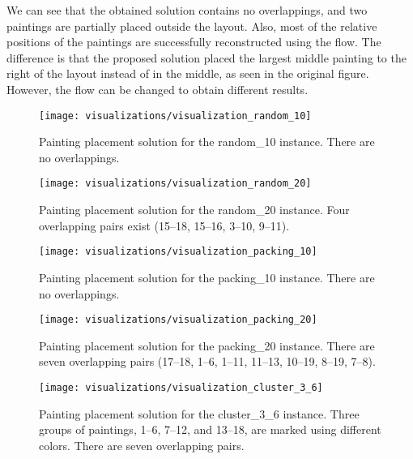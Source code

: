 We can see that the obtained solution contains no overlappings, and two paintings are partially placed outside the layout.
Also, most of the relative positions of the paintings are successfully reconstructed using the flow.
The difference is that the proposed solution placed the largest middle painting to the right of the layout
instead of in the middle, as seen in the original figure.
However, the flow can be changed to obtain different results.


\clearpage
\newpage

\begin{figure}[h!]
    \texttt{[image: visualizations/visualization\_random\_10]}
    \caption[Painting placement solution for the random\_10 instance]
        {Painting placement solution for the random\_10 instance.
    There are no overlappings.}
    \label{fig:results:visualization-random-10}
\end{figure}

\begin{figure}[h!]
    \texttt{[image: visualizations/visualization\_random\_20]}
    \caption[Painting placement solution for the random\_20 instance]
        {Painting placement solution for the random\_20 instance.
    Four overlapping pairs exist (15–18, 15–16, 3–10, 9–11).}
    \label{fig:results:visualization-random-20}
\end{figure}

\begin{figure}[h!]
    \texttt{[image: visualizations/visualization\_packing\_10]}
    \caption[Painting placement solution for the packing\_10 instance]
        {Painting placement solution for the packing\_10 instance.
    There are no overlappings.}
    \label{fig:results:visualization-packing-10}
\end{figure}

\begin{figure}[h!]
    \texttt{[image: visualizations/visualization\_packing\_20]}
    \caption[Painting placement solution for the packing\_20 instance]
        {Painting placement solution for the packing\_20 instance.
    There are seven overlapping pairs (17–18, 1–6, 1–11, 11–13, 10–19, 8–19, 7–8).}
    \label{fig:results:visualization-packing-20}
\end{figure}

\begin{figure}[h!]
    \texttt{[image: visualizations/visualization\_cluster\_3\_6]}
    \caption[Painting placement solution for the cluster\_3\_6 instance]
        { Painting placement solution for the cluster\_3\_6 instance.
    Three groups of paintings, \numrange{1}{6}, \numrange{7}{12}, and \numrange{13}{18}, are marked using different colors.
    There are seven overlapping pairs.}
    \label{fig:results:visualization-cluster-3-6}
\end{figure}

